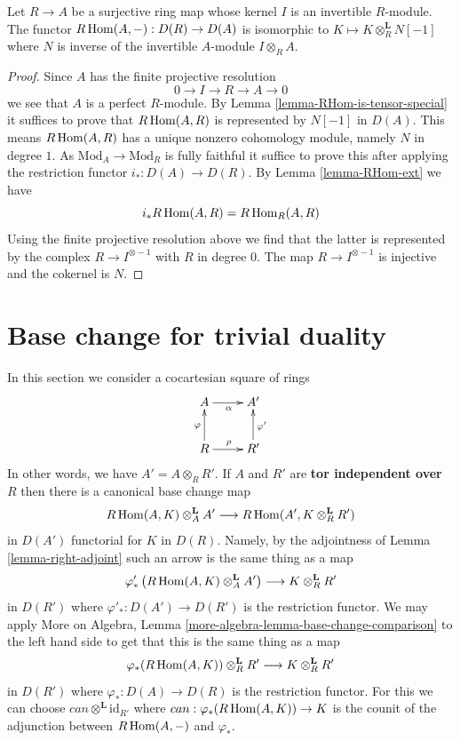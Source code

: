 \begin{lemma}
\label{lemma-compute-for-effective-Cartier-algebraic}
Let $R \to A$ be a surjective ring map whose kernel $I$
is an invertible $R$-module. The functor
$R\mathop{\mathrm{Hom}}\nolimits(A, -) : D(R) \to D(A)$
is isomorphic to $K \mapsto K \otimes_R^\mathbf{L} N[-1]$
where $N$ is inverse of the invertible $A$-module $I \otimes_R A$.
\end{lemma}

\begin{proof}
Since $A$ has the finite projective resolution
$$
0 \to I \to R \to A \to 0
$$
we see that $A$ is a perfect $R$-module. By
Lemma \ref{lemma-RHom-is-tensor-special} it suffices
to prove that $R\mathop{\mathrm{Hom}}\nolimits(A, R)$ is represented by $N[-1]$ in $D(A)$.
This means $R\mathop{\mathrm{Hom}}\nolimits(A, R)$ has a unique nonzero
cohomology module, namely $N$ in degree $1$. As
$\text{Mod}_A \to \text{Mod}_R$ is fully faithful it suffice to prove
this after applying the restriction functor $i_* : D(A) \to D(R)$.
By Lemma \ref{lemma-RHom-ext} we have
$$
i_*R\mathop{\mathrm{Hom}}\nolimits(A, R) = R\mathop{\mathrm{Hom}}\nolimits_R(A, R)
$$
Using the finite projective resolution above we find that the latter
is represented by the complex $R \to I^{\otimes -1}$ with $R$
in degree $0$. The map $R \to I^{\otimes -1}$ is injective
and the cokernel is $N$.
\end{proof}





\section{Base change for trivial duality}
\label{section-base-change-trivial-duality}

\noindent
In this section we consider a cocartesian square of rings
$$
\xymatrix{
A \ar[r]_\alpha & A' \\
R \ar[u]^\varphi \ar[r]^\rho & R' \ar[u]_{\varphi'}
}
$$
In other words, we have $A' = A \otimes_R R'$. If $A$ and $R'$
are {\bf tor independent over} $R$ then there is a canonical base change map
\begin{equation}
\label{equation-base-change}
R\mathop{\mathrm{Hom}}\nolimits(A, K) \otimes_A^\mathbf{L} A'
\longrightarrow
R\mathop{\mathrm{Hom}}\nolimits(A', K \otimes_R^\mathbf{L} R')
\end{equation}
in $D(A')$ functorial for $K$ in $D(R)$. Namely, by the adjointness
of Lemma \ref{lemma-right-adjoint} such an arrow is the same thing as a map
$$
\varphi'_*\left(R\mathop{\mathrm{Hom}}\nolimits(A, K) \otimes_A^\mathbf{L} A'\right)
\longrightarrow
K \otimes_R^\mathbf{L} R'
$$
in $D(R')$ where $\varphi'_* : D(A') \to D(R')$ is the restriction functor.
We may apply
More on Algebra, Lemma \ref{more-algebra-lemma-base-change-comparison}
to the left hand side to get that this is the same thing as a map
$$
\varphi_*(R\mathop{\mathrm{Hom}}\nolimits(A, K)) \otimes_R^\mathbf{L} R'
\longrightarrow
K \otimes_R^\mathbf{L} R'
$$
in $D(R')$ where $\varphi_* : D(A) \to D(R)$ is the restriction functor.
For this we can choose $can \otimes^\mathbf{L} \text{id}_{R'}$
where $can : \varphi_*(R\mathop{\mathrm{Hom}}\nolimits(A, K)) \to K$ is the
counit of the adjunction between $R\mathop{\mathrm{Hom}}\nolimits(A, -)$ and $\varphi_*$.

